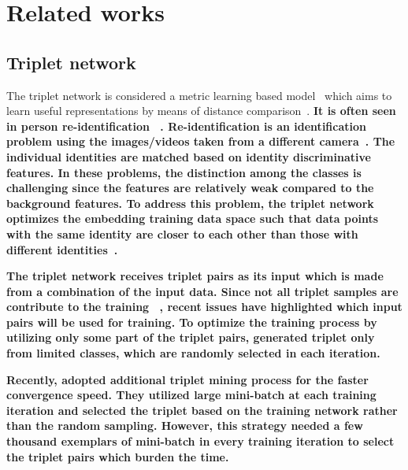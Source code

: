\documentclass[runningheads]{llncs}
\begin{document}
\section{Related works}

\subsection{Triplet network}
The triplet network is considered a metric learning based model~\cite{weinberger2006distance} which aims to learn useful representations by means of distance comparison~\cite{hoffer2015deep}. 
\textbf{It is often seen in person re-identification~
\cite{chen2017beyond,cheng2016person,ding2015deep,schroff2015facenet,wang2016joint}. Re-identification is an identification problem using the images/videos taken from a different camera~\cite{bedagkar2014survey}. The individual identities are matched based on identity discriminative features. In these problems, the distinction among the classes is challenging since the features are relatively weak compared to the background features. To address this problem, the triplet network optimizes the embedding training data space such that data points with the same identity are closer to each other than those with different identities~\cite{hermans2017defense}.}

\textbf{The triplet network receives triplet pairs as its input which is made from a combination of the input data. Since not all triplet samples are contribute to the training ~\cite{schroff2015facenet}, recent issues have highlighted which input pairs will be used for training. To optimize the training process by utilizing only some part of the triplet pairs, \cite{cheng2016person,ding2015deep,wang2016joint} generated triplet only from limited classes, which are randomly selected in each iteration.}

\textbf{Recently, \cite{schroff2015facenet} adopted additional triplet mining process for the faster convergence speed. They utilized large mini-batch at each training iteration and selected the triplet based on the training network rather than the random sampling. However, this strategy needed a few thousand exemplars of mini-batch in every training iteration to select the triplet pairs which burden the time.}

\end{document}
